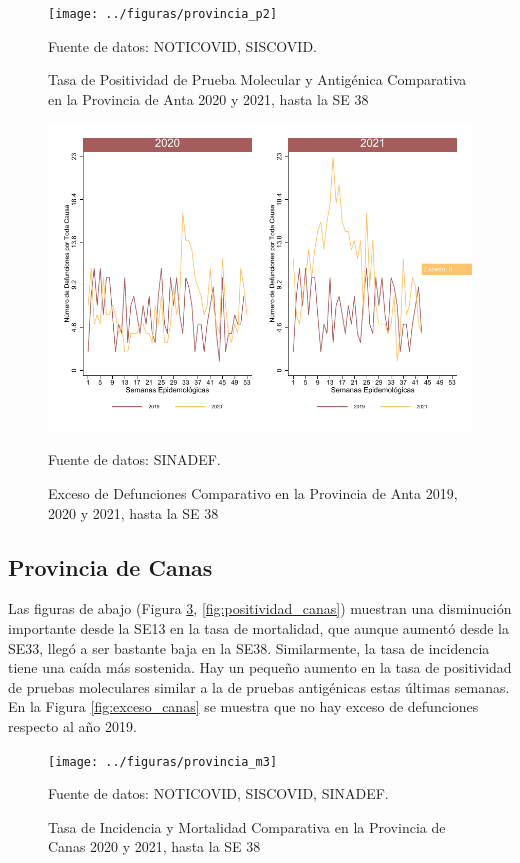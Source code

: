\documentclass[12pt,a4paper,openany]{book}
\begin{document}
	\begin{figure}[h]
		\caption{Tasa de Positividad de Prueba Molecular y Antigénica Comparativa en la Provincia de Anta 2020 y 2021, hasta la SE 38}\label{fig:positividad_anta}
		\begin{center}
			\texttt{[image: ../figuras/provincia\_p2]}
		\end{center}
		{\footnotesize {Fuente de datos: NOTICOVID, SISCOVID.}}
	\end{figure}
	
	\begin{figure}[h]
		\caption{Exceso de Defunciones Comparativo en la Provincia de Anta 2019, 2020 y 2021, hasta la SE 38}\label{fig:exceso_anta}
		\begin{center}
			\includegraphics[width=0.7\linewidth]{../figuras/exceso_2}
		\end{center}
		{\footnotesize {Fuente de datos: SINADEF.}}
	\end{figure}

		\clearpage
	
	\subsection*{Provincia de Canas}
	\noindent Las figuras de abajo (Figura \ref{fig:inc_mort_canas}, \ref{fig:positividad_canas})  muestran una disminución importante desde la SE13 en la tasa de mortalidad, que aunque aumentó desde la SE33, llegó a ser bastante baja en la SE38. Similarmente, la tasa de incidencia tiene una caída más sostenida. Hay un pequeño aumento en la tasa de positividad de pruebas moleculares similar a la de pruebas antigénicas estas últimas semanas. En la Figura \ref{fig:exceso_canas} se muestra que no hay exceso de defunciones respecto al año 2019.
	
	\begin{figure}[h]
		\caption{Tasa de Incidencia y Mortalidad Comparativa en la Provincia de Canas 2020 y 2021, hasta la SE 38}\label{fig:inc_mort_canas}
		\begin{center}
			\texttt{[image: ../figuras/provincia\_m3]}
		\end{center}
		{\footnotesize {Fuente de datos: NOTICOVID, SISCOVID, SINADEF.}}
	\end{figure}
	
\end{document}

